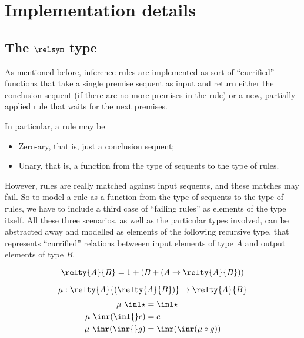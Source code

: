 \section{Implementation details}

\subsection{The $\relsym$ type}

As mentioned before, inference rules are implemented as sort of ``currified''
functions that take a single premise sequent as input and return either the
conclusion sequent (if there are no more premises in the rule) or a new,
partially applied rule that waits for the next premises.

In particular, a rule may be

\begin{itemize}
\item Zero-ary, that is, just a conclusion sequent;
\item Unary, that is, a function from the type of sequents to the type of rules.
\end{itemize}

However, rules are really matched against input sequents, and these matches may
fail. So to model a rule as a function from the type of sequents to the type of
rules, we have to include a third case of ``failing rules'' as elements of the
type itself.  All these three scenarios, as well as the particular types
involved, can be abstracted away and modelled as elements of the following
recursive type, that represents ``currified'' relations betweeen input elements
of type $A$ and output elements of type $B$.

\[
  \relty{A}{B} = 1 + (B + (A \rightarrow \relty{A}{B}))
\]

\[
  \mu : \relty{A}{(\relty{A}{B})} \to \relty{A}{B}
\]
\begin{align*}
  \mu\ \inl \star & = \inl \star \\
  \mu\ \inr(\inl{} c) & = c \\
  \mu\ \inr(\inr{} g) & = \inr(\inr(\mu \circ g))
\end{align*}

